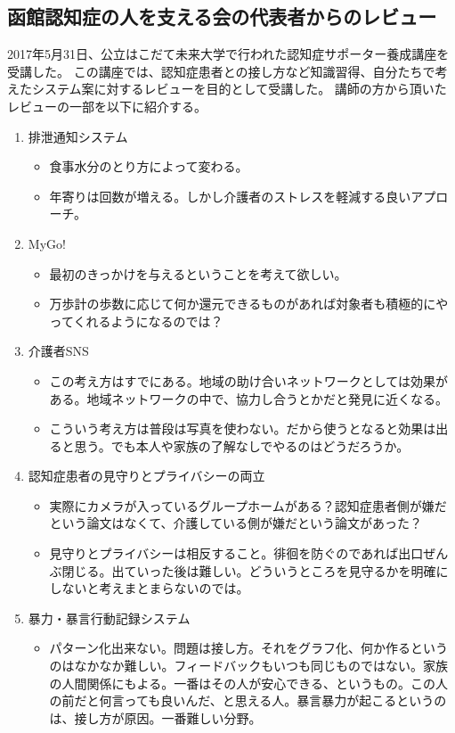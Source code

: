 \documentclass[../report]{subfiles}
\begin{document}
\subsection{函館認知症の人を支える会の代表者からのレビュー}
2017年5月31日、公立はこだて未来大学で行われた認知症サポーター養成講座を受講した。
この講座では、認知症患者との接し方など知識習得、自分たちで考えたシステム案に対するレビューを目的として受講した。
講師の方から頂いたレビューの一部を以下に紹介する。
\begin{enumerate}
    \item 排泄通知システム
        \begin{itemize}
            \item 食事水分のとり方によって変わる。
            \item 年寄りは回数が増える。しかし介護者のストレスを軽減する良いアプローチ。
        \end{itemize}
    \item MyGo!
        \begin{itemize}
            \item 最初のきっかけを与えるということを考えて欲しい。
            \item 万歩計の歩数に応じて何か還元できるものがあれば対象者も積極的にやってくれるようになるのでは？
        \end{itemize}
    \item 介護者SNS
        \begin{itemize}
            \item この考え方はすでにある。地域の助け合いネットワークとしては効果がある。地域ネットワークの中で、協力し合うとかだと発見に近くなる。
            \item こういう考え方は普段は写真を使わない。だから使うとなると効果は出ると思う。でも本人や家族の了解なしでやるのはどうだろうか。
        \end{itemize}
    \item 認知症患者の見守りとプライバシーの両立
        \begin{itemize}
            \item 実際にカメラが入っているグループホームがある？認知症患者側が嫌だという論文はなくて、介護している側が嫌だという論文があった？
            \item 見守りとプライバシーは相反すること。徘徊を防ぐのであれば出口ぜんぶ閉じる。出ていった後は難しい。どういうところを見守るかを明確にしないと考えまとまらないのでは。
        \end{itemize}
    \item 暴力・暴言行動記録システム
        \begin{itemize}
            \item パターン化出来ない。問題は接し方。それをグラフ化、何か作るというのはなかなか難しい。フィードバックもいつも同じものではない。家族の人間関係にもよる。一番はその人が安心できる、というもの。この人の前だと何言っても良いんだ、と思える人。暴言暴力が起こるというのは、接し方が原因。一番難しい分野。
        \end{itemize}
\end{enumerate}
\end{document}
